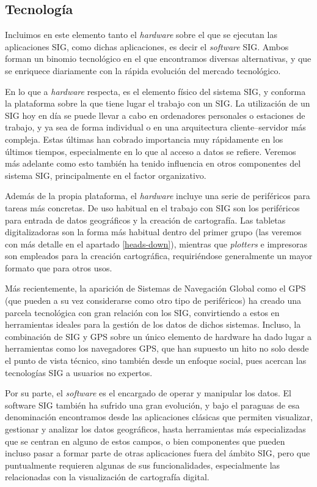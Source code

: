 \subsection{Tecnología}

Incluimos en este elemento tanto el \emph{hardware} sobre el que se ejecutan las aplicaciones SIG, como dichas aplicaciones, es decir el \emph{software} SIG. Ambos forman un binomio tecnológico en el que encontramos diversas alternativas, y que se enriquece diariamente con la rápida evolución del mercado tecnológico.

En lo que a \emph{hardware} respecta, es el elemento físico del sistema SIG, y conforma la plataforma sobre la que tiene lugar el trabajo con un SIG. La utilización de un SIG hoy en día se puede llevar a cabo en ordenadores personales o estaciones de trabajo, y ya sea de forma individual o en una arquitectura cliente--servidor más compleja. Estas últimas han cobrado importancia muy rápidamente en los últimos tiempos, especialmente en lo que al acceso a datos se refiere. Veremos más adelante como esto también ha tenido influencia en otros componentes del sistema SIG, principalmente en el factor organizativo.

Además de la propia plataforma, el \emph{hardware} incluye una serie de periféricos para tareas más concretas. De uso habitual en el trabajo con SIG son los periféricos para entrada de datos geográficos y la creación de cartografía. Las tabletas digitalizadoras son la forma más habitual dentro del primer grupo (las veremos con más detalle en el apartado \ref{heads-down}), mientras que \emph{plotters} e impresoras son empleados para la creación cartográfica, requiriéndose generalmente un mayor formato que para otros usos.

Más recientemente, la aparición de Sistemas de Navegación Global como el GPS (que pueden a su vez considerarse como otro tipo de periféricos) ha creado una parcela tecnológica con gran relación con los SIG, convirtiendo a estos en herramientas ideales para la gestión de los datos de dichos sistemas. Incluso, la combinación de SIG y GPS sobre un único elemento de hardware ha dado lugar a herramientas como los navegadores GPS, que han supuesto un hito no solo desde el punto de vista técnico, sino también desde un enfoque social, pues acercan las tecnologías SIG a usuarios no expertos.

Por su parte, el \emph{software} es el encargado de operar y manipular los datos. El software SIG también ha sufrido una gran evolución, y bajo el paraguas de esa denominación encontramos desde las aplicaciones clásicas que permiten visualizar, gestionar y analizar los datos geográficos, hasta herramientas más especializadas que se centran en alguno de estos campos, o bien componentes que pueden incluso pasar a formar parte de otras aplicaciones fuera del ámbito SIG, pero que puntualmente requieren algunas de sus funcionalidades, especialmente las relacionadas con la visualización de cartografía digital.

